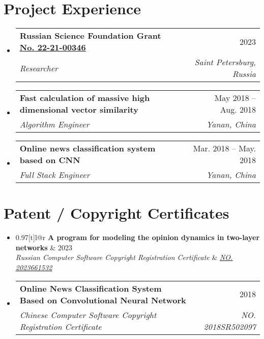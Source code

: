 \documentclass[letterpaper,10pt]{article}
\makeatletter
\newcommand{\link}[2]{\href{#1}{\color{blue}\underline{#2}}}
\newcommand{\resumeSubheading}[4]{
  \vspace{-2pt}\item
  \begin{tabular*}{0.97\textwidth}[t]{l@{\extracolsep{\fill}}r}
    \textbf{#1} & #2 \\
    \textit{\small#3} & \textit{\small #4} \\
  \end{tabular*}\vspace{-7pt}
}
\newenvironment{resumeSubHeadingList}{\begin{itemize}[leftmargin=0.15in, label={}]}{\end{itemize}}
\makeatother
\begin{document}
\section{Project Experience}
\begin{resumeSubHeadingList}
  \resumeSubheading
    {Russian Science Foundation Grant \link{https://rscf.ru/en/project/22-21-00346/}{No. 22-21-00346}}{2023}
    {Researcher}{Saint Petersburg, Russia}
  \resumeSubheading
    {Fast calculation of massive high dimensional vector similarity}{May 2018 -- Aug. 2018}
    {Algorithm Engineer}{Yanan, China}
    
  \resumeSubheading
    {Online news classification system based on CNN}{Mar. 2018 -- May. 2018}
    {Full Stack Engineer}{Yanan, China}

\end{resumeSubHeadingList}


\section{Patent / Copyright Certificates}
\begin{resumeSubHeadingList}
  \resumeSubheading
    {A program for modeling the opinion dynamics in two-layer networks}{2023}
    {Russian Computer Software Copyright Registration Certificate}{{\link{https://new.fips.ru/registers-doc-view/fips_servlet?DB=EVM&DocNumber=2023661532&TypeFile=html}{NO. 2023661532}}}
    
  \resumeSubheading
    {Online News Classification System Based on Convolutional Neural Network}{2018}
    {Chinese Computer Software Copyright Registration Certificate}{NO. 2018SR502097}
\end{resumeSubHeadingList}
\end{document}
